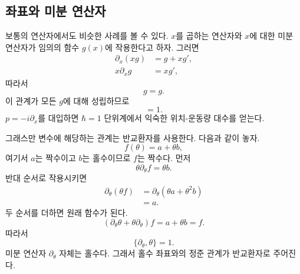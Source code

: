 \begin{classroomqa}
\end{classroomqa}

\subsection{좌표와 미분 연산자}

보통의 연산자에서도 비슷한 사례를 볼 수 있다. \(x\)를 곱하는 연산자와 \(x\)에 대한 미분 연산자가 임의의 함수 \(g(x)\)에 작용한다고 하자. 그러면
\begin{align}
\partial_x\!\left(xg\right)&=g+xg',\\
x\partial_xg&=xg',
\end{align}
따라서
\begin{equation}
[\partial_x,x]g=g.
\end{equation}
이 관계가 모든 \(g\)에 대해 성립하므로
\begin{equation}
[\partial_x,x]=1.
\end{equation}
\(p=-i\partial_x\)를 대입하면 \(\hbar=1\) 단위계에서 익숙한 위치-운동량 대수를 얻는다.

그래스만 변수에 해당하는 관계는 반교환자를 사용한다. 다음과 같이 놓자.
\begin{equation}
f(\theta)=a+\theta b,
\end{equation}
여기서 \(a\)는 짝수이고 \(b\)는 홀수이므로 \(f\)는 짝수다. 먼저
\begin{equation}
\theta\partial_\theta f=\theta b.
\end{equation}
반대 순서로 작용시키면
\begin{align}
\partial_\theta(\theta f)
&=\partial_\theta(\theta a+\theta^2b)\\
&=a.
\end{align}
두 순서를 더하면 원래 함수가 된다.
\begin{equation}
\left(\partial_\theta\theta+\theta\partial_\theta\right)f
=a+\theta b=f.
\end{equation}
따라서
\begin{equation}
\boxed{\{\partial_\theta,\theta\}=1.}
\end{equation}
미분 연산자 \(\partial_\theta\) 자체는 홀수다. 그래서 홀수 좌표와의 정준 관계가 반교환자로 주어진다.

